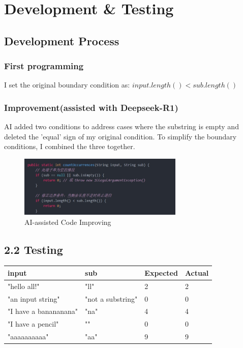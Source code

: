 \documentclass[12pt,a4paper]{article}
\begin{document}
\section{Development \& Testing}
\subsection{Development Process}
\subsubsection{First programming}
I set the original boundary condition as: $input.length() < sub.length()$
\subsubsection{Improvement(assisted with Deepseek-R1)}
AI added two conditions to address cases where the substring is empty and deleted the 'equal' sign of my original condition.
To simplify the boundary conditions, I combined the three together.

\begin{figure}[h]
\centering
\includegraphics[width=0.7\textwidth]{CW1W6.png}
\caption{AI-assisted Code Improving}
\end{figure}


\subsection*{2.2 Testing}
\begin{tabular}{|l|m{2cm}|m{2cm}|m{2cm}|}
\hline
\textbf{input}&\textbf{sub}& \textbf{Expected} & \textbf{Actual} \\
\hline
"hello all!"  & "ll" & 2 & 2 \\
\hline
"an input string"  & "not a substring"& 0 & 0 \\
\hline
"I have a banananana"  & "na" &4& 4 \\
\hline 
"I have a pencil"  & "" &0& 0 \\
\hline 
"aaaaaaaaaa"&"aa"&9&9\\
\hline
\end{tabular}
\end{document}
